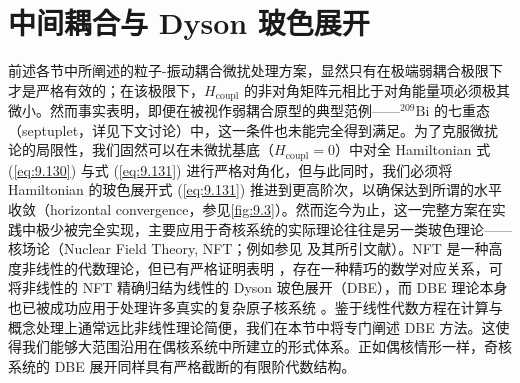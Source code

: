 \section{\label{sec:9.3.6}\label{subsec:9.3.6_=004E2D=007B49=008026=005408=004E0EDyson=0073BB=008272=005C55=005F00}中间耦合与
Dyson 玻色展开}

前述各节中所阐述的粒子-振动耦合微扰处理方案，显然只有在极端弱耦合极限下才是严格有效的；在该极限下，$H_{\text{coupl}}$
的非对角矩阵元相比于对角能量项必须极其微小。然而事实表明，即便在被视作弱耦合原型的典型范例——$^{209}\text{Bi}$
的七重态（septuplet，详见下文讨论）中，这一条件也未能完全得到满足。为了克服微扰论的局限性，我们固然可以在未微扰基底（$H_{\text{coupl}}=0$）中对全
Hamiltonian 式 (\ref{eq:9.130}) 与式 (\ref{eq:9.131}) 进行严格对角化，但与此同时，我们必须将
Hamiltonian 的玻色展开式 (\ref{eq:9.131}) 推进到更高阶次，以确保达到所谓的水平收敛（horizontal
convergence，参见\ref{fig:9.3}）。然而迄今为止，这一完整方案在实践中极少被完全实现，主要应用于奇核系统的实际理论往往是另一类玻色理论——核场论（Nuclear
Field Theory, NFT；例如参见 \cite{Re75b,BBB77} 及其所引文献）。NFT 是一种高度非线性的代数理论，但已有严格证明表明
\cite{IRS79}，存在一种精巧的数学对应关系，可将非线性的 NFT 精确归结为线性的 Dyson 玻色展开（DBE），而
DBE 理论本身也已被成功应用于处理许多真实的复杂原子核系统 \cite{DJ73,RS74b,SWR76,IRS80}。鉴于线性代数方程在计算与概念处理上通常远比非线性理论简便，我们在本节中将专门阐述
DBE 方法。这使得我们能够大范围沿用在偶核系统中所建立的形式体系。正如偶核情形一样，奇核系统的 DBE 展开同样具有严格截断的有限阶代数结构。

